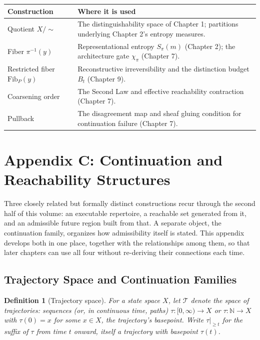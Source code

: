 \documentclass[12pt]{report}
\newtheorem{definition}{Definition}[section]
\begin{document}
\begin{center}
\begin{tabular}{lp{4.3in}}
\hline
Construction & Where it is used \\
\hline
Quotient $X/{\sim}$ & The distinguishability space of Chapter 1;
partitions underlying Chapter 2's entropy measures. \\
Fiber $\pi^{-1}(y)$ & Representational entropy $S_\pi(m)$ (Chapter 2);
the architecture gate $\chi_\pi$ (Chapter 7). \\
Restricted fiber $\mathrm{Fib}_P(y)$ & Reconstructive irreversibility
and the distinction budget $B_t$ (Chapter 9). \\
Coarsening order & The Second Law and effective reachability
contraction (Chapter 7). \\
Pullback & The disagreement map and sheaf gluing condition for
continuation failure (Chapter 7). \\
\hline
\end{tabular}
\end{center}

\chapter*{Appendix C: Continuation and Reachability Structures}

Three closely related but formally distinct constructions recur through
the second half of this volume: an executable repertoire, a reachable
set generated from it, and an admissible future region built from that.
A separate object, the continuation family, organizes how admissibility
itself is stated. This appendix develops both in one place, together
with the relationships among them, so that later chapters can use all
four without re-deriving their connections each time.

\section*{Trajectory Space and Continuation Families}

\begin{definition}[Trajectory space]
For a state space $X$, let $\mathcal{T}$ denote the space of
trajectories: sequences (or, in continuous time, paths) $\tau :
[0,\infty) \to X$ or $\tau : \mathbb{N} \to X$ with $\tau(0) = x$ for
some $x \in X$, the trajectory's basepoint. Write $\tau|_{\geq t}$ for
the suffix of $\tau$ from time $t$ onward, itself a trajectory with
basepoint $\tau(t)$.
\end{definition}
\end{document}
